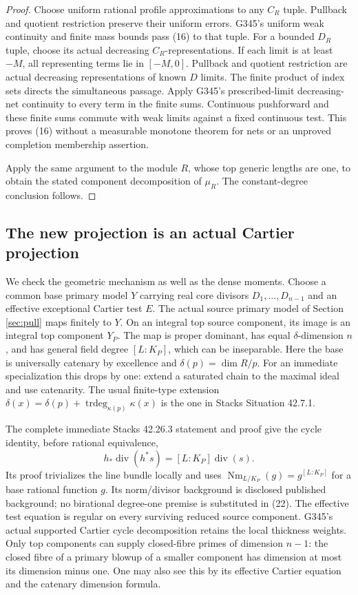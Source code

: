 \begin{proof}
Choose uniform rational profile approximations to any \(C_R\)
tuple. Pullback and quotient restriction preserve their uniform
errors. G345's uniform weak continuity and finite mass bounds
pass (16) to that tuple. For a bounded \(D_R\) tuple, choose its
actual decreasing \(C_R\)-representations. If each limit is
at least \(-M\), all representing terms lie in \([-M,0]\).
Pullback and quotient restriction are actual decreasing
representations of known \(D\) limits. The finite product of
index sets directs the simultaneous passage. Apply G345's
prescribed-limit decreasing-net continuity to every term in
the finite sums. Continuous pushforward and these finite sums
commute with weak limits against a fixed continuous test.
This proves (16) without a measurable monotone theorem for nets
or an unproved completion membership assertion.

Apply the same argument to the module \(R\), whose top generic
lengths are one, to obtain the stated component decomposition
of \(\mu_R\). The constant-degree conclusion follows.
\end{proof}

\subsection*{The new projection is an actual Cartier projection}
We check the geometric mechanism as well as the dense moments.
Choose a common base primary model \(Y\) carrying real core
divisors \(D_1,\ldots,D_{n-1}\) and an effective exceptional
Cartier test \(E\). The actual source primary model of Section
\ref{sec:pull} maps finitely to \(Y\).
On an integral top source component, its image is an integral
top component \(Y_P\). The map is proper dominant, has equal
\(\delta\)-dimension \(n\), and has general field degree
\([L:K_P]\), which can be inseparable.
Here the base is universally catenary by excellence and
\(\delta(p)=\dim R/p\). For an immediate specialization this
drops by one: extend a saturated chain to the maximal ideal
and use catenarity. The usual finite-type extension
\(\delta(x)=\delta(p)+\operatorname{trdeg}_{\kappa(p)}\kappa(x)\)
is the one in Stacks Situation 42.7.1.

The complete immediate Stacks 42.26.3 statement and proof give
the cycle identity, before rational equivalence,
\[
 h_*\operatorname{div}(h^*s)
      =[L:K_P]\operatorname{div}(s).                          \tag{22}
\]
Its proof trivializes the line bundle locally and uses
\(\operatorname{Nm}_{L/K_P}(g)=g^{[L:K_P]}\) for a base rational
function \(g\). Its norm/divisor background is disclosed
published background; no birational degree-one premise is
substituted in (22).
The effective test equation is regular on every surviving
reduced source component. G345's actual supported Cartier
cycle decomposition retains the local thickness weights.
Only top components can supply closed-fibre primes of dimension
\(n-1\): the closed fibre of a primary blowup of a smaller
component has dimension at most its dimension minus one.
One may also see this by its effective Cartier equation and
the catenary dimension formula.

